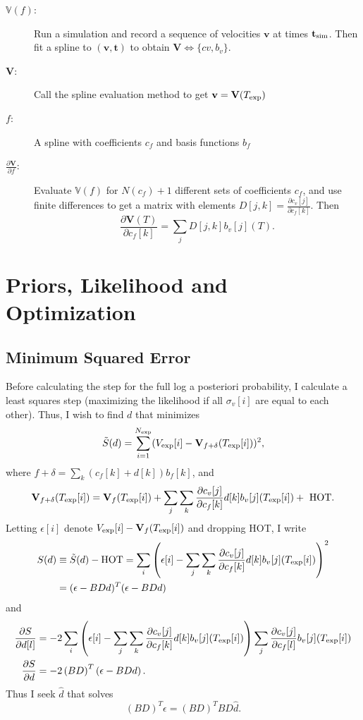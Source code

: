 \documentclass[11pt]{article}
\newcommand{\partiald}[2]{\frac{\partial #1}{\partial #2}}
\newcommand\bv{\mathbf{v}}
\newcommand\bt{\mathbf{t}}
\newcommand\Vfunc{\mathbb{V}}
\newcommand\Vt{\mathbf{V}}
\newcommand\vexp{V_{\rm{exp}}}
\newcommand\texp{T_{\rm{exp}}}
\newcommand\cf{c_f}
\newcommand\cv{c_v}
\newcommand\fbasis{b_f}
\newcommand\vbasis{b_v}
\newcommand\tsim{{\mathbf t}_{\rm{sim}}}
\newcommand\DVDf{\partiald{\Vt}{f}}
\begin{document}
\begin{description}
\item[$\Vfunc(f)$:] Run a simulation and record a sequence of
  velocities $\bv$ at times $\tsim$.  Then fit a
  spline to $(\bv, \bt)$ to obtain $\Vt\iff \{cv,\vbasis\}$.
\item[$\Vt$:] Call the spline evaluation method to get $\bv = \Vt(\texp)$
\item[$f$:] A spline with coefficients $\cf$ and basis functions
  $\fbasis$
\item[$\DVDf$:] Evaluate $\Vfunc(f)$ for $N(\cf)+1$ different sets of
  coefficients $\cf$, and use finite differences to get a matrix with
  elements $D[j,k] = \partiald{\cv[j]}{\cf[k]}$.  Then
  \begin{equation*}
    \partiald{\Vt(T)}{\cf[k]} = \sum_j D[j,k] \vbasis[j](T).
  \end{equation*}
\end{description}

\section{Priors, Likelihood and Optimization}
\label{sec:opt}

\subsection{Minimum Squared Error}
\label{sec:minsq}

Before calculating the step for the full log a posteriori probability,
I calculate a least squares step (maximizing the likelihood if all
$\sigma_v[i]$ are equal to each other).  Thus, I wish to find $d$ that
minimizes
\begin{equation}
  \label{eq:ssq}
  \tilde S(d) = \sum_{i=1}^{N_{\rm exp}} (\vexp[i] - \Vt_{f+\delta}(\texp[i]))^2,
\end{equation}
where $f+\delta = \sum_k (\cf[k] + d[k])\fbasis[k]$, and 
\begin{equation}
  \label{eq:taylor}
  \Vt_{f+\delta}(\texp[i]) = \Vt_f(\texp[i]) +
  \sum_j \sum_k \partiald{\cv[j]}{\cf[k]}d[k]\vbasis[j](\texp[i])
  +\text{ HOT}.
\end{equation}
Letting $\epsilon[i]$ denote $\vexp[i] - \Vt_f(\texp[i])$ and dropping
HOT, I write
\begin{align*}
  S(d) &\equiv \tilde S(d) - \text{HOT} = \sum_i \left( \epsilon[i] -
  \sum_j \sum_k \partiald{\cv[j]}{\cf[k]}d[k]\vbasis[j](\texp[i])
  \right)^2\\
  &= (\epsilon - BDd)^T(\epsilon - BDd)
\end{align*}
and
\begin{align*}
  \partiald{S}{d[l]} &= -2 \sum_i \left( \epsilon[i] -
  \sum_j \sum_k \partiald{\cv[j]}{\cf[k]}d[k]\vbasis[j](\texp[i])
  \right)
  \sum_j \partiald{\cv[j]}{\cf[l]}\vbasis[j](\texp[i])\\
  \partiald{S}{d} &= -2\left(BD\right)^T\left(\epsilon - BDd\right).
\end{align*}
Thus I seek $\hat d$ that solves
\begin{equation}
  \label{eq:dhat}
  \left(BD\right)^T\epsilon = \left(BD\right)^T BD \hat d.
\end{equation}
\end{document}

